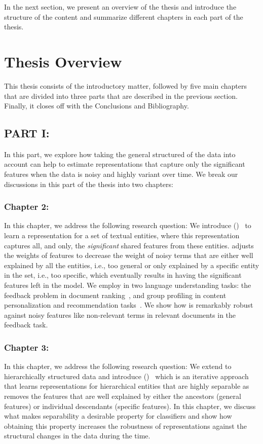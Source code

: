 In the next section, we present an overview of the thesis and introduce the structure of the content and summarize different chapters in each part of the thesis.

\section{Thesis Overview}
This thesis consists of the introductory matter, followed by five main
chapters that are divided into three parts that are described in the previous section. Finally, it closes off with the Conclusions and Bibliography. 

\subsection*{PART I: }
In this part, we explore how taking the general structured of the data into account can help to estimate representations that capture only the significant features when the data is noisy and highly variant over time. We break our discussions in this part of the thesis into two chapters:

\subsubsection*{Chapter 2: }
In this chapter, we address the following research question:
We introduce \emph{\swlms} (\acswlm)~\citep{Dehghani:2016:SIGIR} to learn a representation for a set of textual entities, where this representation captures all, and only, the \textit{significant} shared features from these entities.  \acswlm adjusts the weights of features to decrease the weight of noisy terms that are either well explained by all the entities, i.e., too general or only explained by a specific entity in the set, i.e., too specific, which eventually results in having the significant features left in the model.  
We employ \acswlm in two language understanding tasks: the feedback problem in document ranking~\citep{Dehghani:CIKM2016:long, Dehghani:CIKM2016:short}, and group profiling in content personalization and recommendation tasks~\citep{Dehghani:2016:CHIIR,Dehghani2016:trec}. We show how \acswlm is remarkably robust against noisy features like non-relevant terms in relevant documents in the feedback task. 

\subsubsection*{Chapter 3: }
In this chapter, we address the following research question:
We extend \emph{\swlms} to hierarchically structured data and introduce \emph{\hswlms} (\achswlm)~\citep{Dehghani:2016:ICTIR, Dehghani:2016:CLEF} which is an iterative approach that learns representations for hierarchical entities that are highly separable as \acswlm removes the features that are well explained by either the ancestors (general features) or individual descendants (specific features). In this chapter, we discuss what makes separability a desirable property for classifiers and show how obtaining this property increases the robustness of representations against the structural changes in the data during the time.

